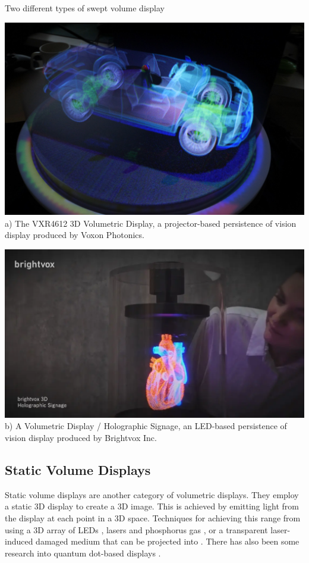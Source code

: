 \begin{figureBox}[label={fig:swept-volume-displays}]{Two different types of swept volume display}
  \begin{minipage}[t]{0.48\textwidth}
    \includegraphics[width=\textwidth]{./background/figures/3d/voxon.jpg}
    \small {a) The VXR4612 3D Volumetric Display, a projector-based persistence of vision display produced by Voxon Photonics. \cite{voxon2}}
  \end{minipage}\hfill
  \begin{minipage}[t]{0.48\textwidth}
    \includegraphics[width=\textwidth]{./background/figures/3d/brightvox.png}
    \small {b) A Volumetric Display / Holographic Signage, an LED-based persistence of vision display produced by Brightvox Inc. \cite{brightvox_2023}}
  \end{minipage}
\end{figureBox}

\subsection{Static Volume Displays}
Static volume displays are another category of volumetric displays. They employ a static 3D display to create a 3D image. This is achieved by emitting light from the display at each point in a 3D space. Techniques for achieving this range from using a 3D array of LEDs \cite{10.1145/2341931.2341937}, lasers and phosphorus gas \cite{https://doi.org/10.1002/anie.202003160}, or a transparent laser-induced damaged medium that can be projected into \cite{10.1145/1179849.1179982}. There has also been some research into quantum dot-based displays \cite{Hirayama2015}.

